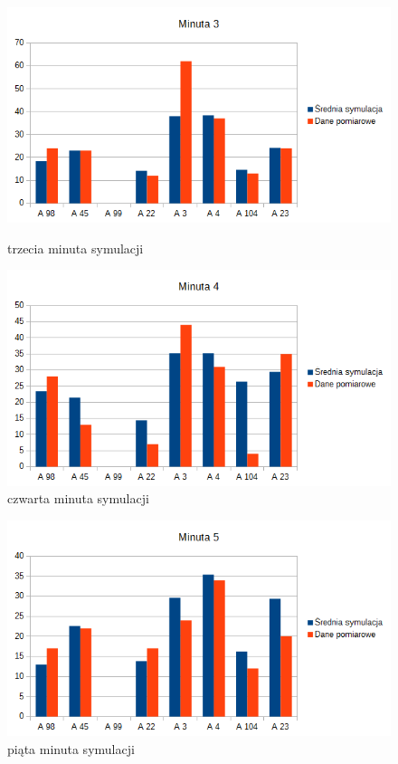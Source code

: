 \documentclass[a4paper,12pt]{article}
\begin{document}
\begin{figure}[!ht]
    \centering
    \begin{minipage}{0.5\textwidth}
        \centering
        \includegraphics[width=\textwidth]{min3.png} %
        \caption{trzecia minuta symulacji}
        \label{fig:3m}
    \end{minipage}\hfill
    \begin{minipage}{0.5\textwidth}
        \centering
        \includegraphics[width=\textwidth]{min4.png} %
        \caption{czwarta minuta symulacji}
        \label{fig:4m}
    \end{minipage}
\end{figure}

\begin{figure}[!ht]
    \centering
    \begin{minipage}{0.5\textwidth}
        \centering
        \includegraphics[width=\textwidth]{min5.png} %
        \caption{piąta minuta symulacji}
        \label{fig:5m}
    \end{minipage}\hfill
\end{figure}
\end{document}

